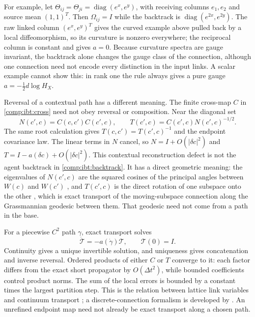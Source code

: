 For example, let $\Theta_{ij}=\Theta_{ji}=\operatorname{diag}(e^x,e^y)$, with receiving columns $e_1,e_2$ and source mean $(1,1)^T$. Then $\Omega_{ij}=I$ while the backtrack is $\operatorname{diag}(e^{2x},e^{2y})$. The raw linked column $(e^x,e^y)^T$ gives the curved example above pulled back by a local diffeomorphism, so its curvature is nonzero everywhere; the reciprocal column is constant and gives $a=0$. Because curvature spectra are gauge invariant, the backtrack alone changes the gauge class of the connection, although one connection need not encode every distinction in the input links. A scalar example cannot show this: in rank one the rule always gives a pure gauge $a=-\frac12d\log H_X$.

Reversal of a contextual path has a different meaning. The finite cross-map $C$ in \cref{comp:ibt:cross} need not obey reversal or composition. Near the diagonal set
\begin{equation}
N(c',c)=C(c,c')C(c',c),\qquad
T(c',c)=C(c',c)N(c',c)^{-1/2}.
\end{equation}
The same root calculation gives $T(c,c')=T(c',c)^{-1}$ and the endpoint covariance law. The linear terms in $N$ cancel, so $N=I+O(|\delta c|^2)$ and $T=I-a(\delta c)+O(|\delta c|^2)$. This contextual reconstruction defect is not the agent backtrack in \cref{comp:ibt:backtrack}. It has a direct geometric meaning: the eigenvalues of $N(c',c)$ are the squared cosines of the principal angles between $W(c)$ and $W(c')$ \citep{BjorckGolub1973}, and $T(c',c)$ is the direct rotation of one subspace onto the other \citep{DavisKahan1970}, which is exact transport of the moving-subspace connection along the Grassmannian geodesic between them. That geodesic need not come from a path in the base.

For a piecewise $C^2$ path $\gamma$, exact transport solves
\begin{equation}
\dot{\mathcal T}=-a(\dot\gamma)\mathcal T,\qquad \mathcal T(0)=I.
\end{equation}
Continuity gives a unique invertible solution, and uniqueness gives concatenation and inverse reversal. Ordered products of either $C$ or $T$ converge to it: each factor differs from the exact short propagator by $O(\Delta t^2)$, while bounded coefficients control product norms. The sum of the local errors is bounded by a constant times the largest partition step. This is the relation between lattice link variables and continuum transport \citep{Wilson1974}; a discrete-connection formalism is developed by \citet{LeokMarsdenWeinstein2005}. An unrefined endpoint map need not already be exact transport along a chosen path.

